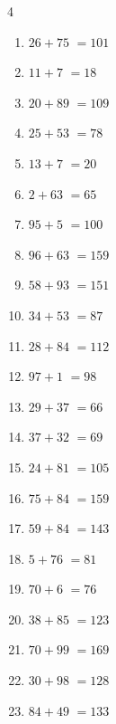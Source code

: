\begin{multicols}{4}
\begin{enumerate}
  \item $26+75$
        $=101$

  \item $11+7$
        $=18$

  \item $20+89$
        $=109$

  \item $25+53$
        $=78$

\columnbreak %

\resetques

  \item $13+7$
        $=20$

  \item $2+63$
        $=65$

  \item $95+5$
        $=100$

  \item $96+63$
        $=159$

  \item $58+93$
        $=151$

  \item $34+53$
        $=87$

  \item $28+84$
        $=112$

  \item $97+1$
        $=98$

  \item $29+37$
        $=66$

  \item $37+32$
        $=69$

  \item $24+81$
        $=105$

  \item $75+84$
        $=159$

  \item $59+84$
        $=143$

  \item $5+76$
        $=81$

  \item $70+6$
        $=76$

  \item $38+85$
        $=123$

  \item $70+99$
        $=169$

  \item $30+98$
        $=128$

  \item $84+49$
        $=133$


\end{enumerate}
\end{multicols}
